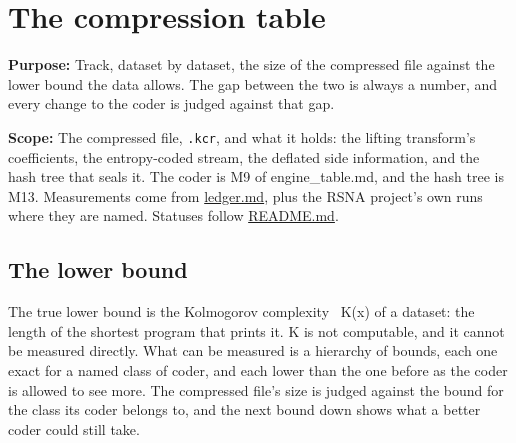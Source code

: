\chapter{\texorpdfstring{The compression table}{The compression table}}
\label{chap:compression-table}

\textbf{Purpose:} Track, dataset by dataset, the size of the compressed file against the lower bound the data allows. The gap between the two is always a number, and every change to the coder is judged against that gap.

\textbf{Scope:} The compressed file, \texttt{.\allowbreak{}kcr}, and what it holds: the lifting transform's coefficients, the entropy-coded stream, the deflated side information, and the hash tree that seals it. The coder is M9 of engine\_\allowbreak{}table.md, and the hash tree is M13. Measurements come from \hyperref[chap:ledger]{ledger.md}, plus the RSNA project's own runs where they are named. Statuses follow \hyperref[chap:readme]{README.md}.

\section{\texorpdfstring{The lower bound}{The lower bound}}

The true lower bound is the Kolmogorov complexity~\cite{src:Kolmogorov} K(x) of a dataset: the length of the shortest program that prints it. K is not computable, and it cannot be measured directly. What can be measured is a hierarchy of bounds, each one exact for a named class of coder, and each lower than the one before as the coder is allowed to see more. The compressed file's size is judged against the bound for the class its coder belongs to, and the next bound down shows what a better coder could still take.

